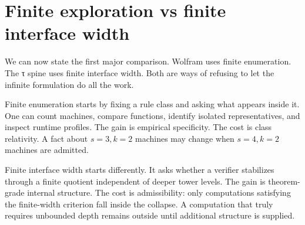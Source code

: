 \documentclass{pantarhei-researchnote}
\begin{document}
\section{Finite exploration vs finite interface width}
\label{sec:finite-interface}

We can now state the first major comparison. Wolfram uses finite
enumeration. The τ spine uses finite interface width. Both are ways of
refusing to let the infinite formulation do all the work.

Finite enumeration starts by fixing a rule class and asking what appears
inside it. One can count machines, compare functions, identify isolated
representatives, and inspect runtime profiles. The gain is empirical
specificity. The cost is class relativity. A fact about \(s=3,k=2\)
machines may change when \(s=4,k=2\) machines are admitted.

Finite interface width starts differently. It asks whether a verifier
stabilizes through a finite quotient independent of deeper tower levels.
The gain is theorem-grade internal structure. The cost is admissibility:
only computations satisfying the finite-width criterion fall inside the
collapse. A computation that truly requires unbounded depth remains outside
until additional structure is supplied.
\end{document}
